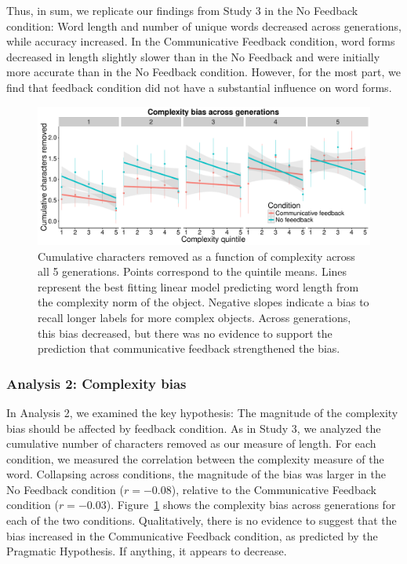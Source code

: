 Thus, in sum, we replicate our findings from Study 3 in the No Feedback condition: Word length and number of unique words decreased across generations, while accuracy increased. In the Communicative Feedback condition, word forms decreased in length slightly slower than in the No Feedback and were initially more accurate than in the No Feedback condition. However, for the most part, we find that feedback condition did not have a substantial influence on word forms.

\begin{figure}[t!]
\begin{center}
\includegraphics[scale = .5]{figs/chap4_4bias.pdf}
\end{center}
\caption{Cumulative characters removed as a function of complexity across all 5 generations. Points correspond to the quintile means. Lines represent the best fitting linear model predicting word length from the complexity norm of the object. Negative slopes indicate a bias to recall longer labels for  more complex objects. Across generations, this bias decreased, but there was no evidence to support the prediction that communicative feedback strengthened the bias.}
\label{fig:cbias4}
\end{figure}


\subsubsection{Analysis 2: Complexity bias}
In Analysis 2, we examined the key hypothesis: The magnitude of the complexity bias should be affected by feedback condition. As in Study 3, we analyzed the cumulative number of characters removed as our measure of length. For each condition, we measured the correlation between the complexity measure of the word. Collapsing across conditions, the magnitude of the bias was larger in the No Feedback condition ($r = -0.08$), relative to the Communicative Feedback condition  ($r = -0.03$).  Figure\ \ref{fig:cbias4} shows the complexity bias across generations for each of the two conditions. Qualitatively, there is no evidence to suggest that the bias increased in the Communicative Feedback condition, as predicted by the Pragmatic Hypothesis. If anything, it appears to decrease. 



